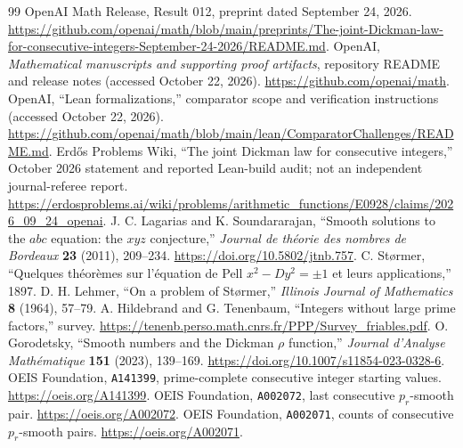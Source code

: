 \documentclass[11pt,letterpaper]{article}
\theoremstyle{remark}
\begin{document}
\begin{thebibliography}{99}
OpenAI Math Release, Result 012, preprint dated September 24, 2026.
\url{https://github.com/openai/math/blob/main/preprints/The-joint-Dickman-law-for-consecutive-integers-September-24-2026/README.md}.
OpenAI, \emph{Mathematical manuscripts and supporting proof artifacts},
repository README and release notes (accessed October 22, 2026).
\url{https://github.com/openai/math}.
OpenAI, ``Lean formalizations,'' comparator scope and verification
instructions (accessed October 22, 2026).
\url{https://github.com/openai/math/blob/main/lean/ComparatorChallenges/README.md}.
Erd\H{o}s Problems Wiki, ``The joint Dickman law for consecutive integers,''
October 2026 statement and reported Lean-build audit; not an independent
journal-referee report.
\url{https://erdosproblems.ai/wiki/problems/arithmetic_functions/E0928/claims/2026_09_24_openai}.
J. C. Lagarias and K. Soundararajan, ``Smooth solutions to the
$abc$ equation: the $xyz$ conjecture,'' \emph{Journal de th\'eorie des
nombres de Bordeaux} \textbf{23} (2011), 209--234.
\url{https://doi.org/10.5802/jtnb.757}.
C. St\o rmer, ``Quelques th\'eor\`emes sur l'\'equation de Pell
$x^2-Dy^2=\pm1$ et leurs applications,'' 1897.
D. H. Lehmer, ``On a problem of St\o rmer,''
\emph{Illinois Journal of Mathematics} \textbf{8} (1964), 57--79.
A. Hildebrand and G. Tenenbaum, ``Integers without large prime
factors,'' survey. \url{https://tenenb.perso.math.cnrs.fr/PPP/Survey_friables.pdf}.
O. Gorodetsky, ``Smooth numbers and the Dickman $\rho$ function,''
\emph{Journal d'Analyse Math\'ematique} \textbf{151} (2023), 139--169.
\url{https://doi.org/10.1007/s11854-023-0328-6}.
OEIS Foundation, \texttt{A141399}, prime-complete consecutive integer
starting values. \url{https://oeis.org/A141399}.
OEIS Foundation, \texttt{A002072}, last consecutive $p_r$-smooth
pair. \url{https://oeis.org/A002072}.
OEIS Foundation, \texttt{A002071}, counts of consecutive
$p_r$-smooth pairs. \url{https://oeis.org/A002071}.
\end{thebibliography}
\end{document}
